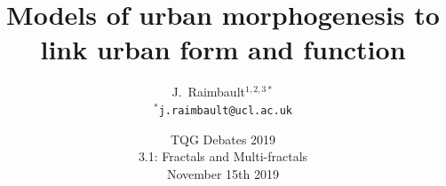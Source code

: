 



\title[Models of urban morphogenesis]{Models of urban morphogenesis to link urban form and function}
\author[J. Raimbault]{J.~Raimbault$^{1,2,3\ast}$\\\medskip
$^{\ast}$\texttt{j.raimbault@ucl.ac.uk}
}





\date[15th November 2019]{TQG Debates 2019\\
3.1: Fractals and Multi-fractals\\
November 15th 2019
}

\frame{\maketitle}




